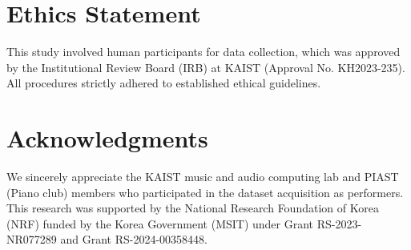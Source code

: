 \documentclass{article}
\begin{document}
 
\section{Ethics Statement}
This study involved human participants for data collection, which was approved by the Institutional Review Board (IRB) at KAIST (Approval No. KH2023-235). All procedures strictly adhered to established ethical guidelines.


\section{Acknowledgments}
We sincerely appreciate the KAIST music and audio computing lab and PIAST (Piano club) members who participated in the dataset acquisition as performers. This research was supported by the National Research Foundation of Korea (NRF) funded by the Korea Government (MSIT) under Grant RS-2023-NR077289 and Grant RS-2024-00358448.



\end{document}
